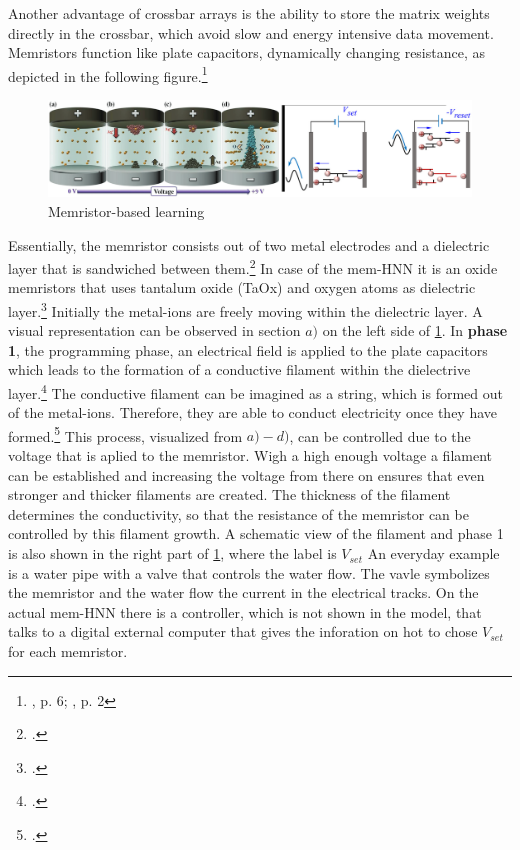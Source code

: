 Another advantage of crossbar arrays is the ability to store the matrix weights directly in the crossbar, which avoid slow and energy intensive data movement. 
Memristors function like plate capacitors, dynamically changing resistance, as depicted in the following figure.\footnote{\cite{changDirectObservationDualFilament2017}, p. 6; \cite{sungPerspectiveReviewMemristive2018}, p. 2}
\begin{figure}[H]
    \centering
    \includegraphics[width=0.9\linewidth]{graphics/Memristor_filoments.png}
    \caption{Memristor-based learning}
    \label{platecondensator}
\end{figure}
Essentially, the memristor consists out of two metal electrodes and a dielectric layer that is sandwiched between them.\footcite[cf.][1]{changDirectObservationDualFilament2017}
In case of the \ac{mem-HNN} it is an oxide memristors that uses tantalum oxide (TaOx) and oxygen atoms as dielectric layer.\footcite[cf.][412]{caiPowerefficientCombinatorialOptimization2020}
Initially the metal-ions are freely moving within the dielectric layer. 
A visual representation can be observed in section \(a)\) on the left side of \ref{platecondensator}.
In \textbf{phase 1}, the programming phase, an electrical field is applied to the plate capacitors which leads to the formation of a conductive filament within the dielectrive layer.\footcite[cf.][3]{changDirectObservationDualFilament2017}
The conductive filament can be imagined as a string, which is formed out of the metal-ions.
Therefore, they are able to conduct electricity once they have formed.\footcite[cf.][5]{changDirectObservationDualFilament2017}
This process, visualized from \(a)-d)\), can be controlled due to the voltage that is aplied to the memristor.
Wigh a high enough voltage a filament can be established and increasing the voltage from there on ensures that even stronger and thicker filaments are created.
The thickness of the filament determines the conductivity, so that the resistance of the memristor can be controlled by this filament growth.
A schematic view of the filament and phase 1 is also shown in the right part of \ref{platecondensator}, where the label is \(V_{set}\) 
An everyday example is a water pipe with a valve that controls the water flow. 
The vavle symbolizes the memristor and the water flow the current in the electrical tracks.
On the actual \ac{mem-HNN} there is a controller, which is not shown in the model, that talks to a digital external computer that gives the inforation on hot to chose \(V_{set}\) for each memristor.

